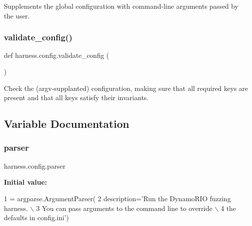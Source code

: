 \begin{DoxyVerb}Supplements the global configuration with command-line arguments
passed by the user.
\end{DoxyVerb}
 \mbox{\label{namespaceharness_1_1config_a372fafd2683cb16e932d6e9ffbf57a54}} 
\subsubsection{\texorpdfstring{validate\+\_\+config()}{validate\_config()}}
{\footnotesize\ttfamily def harness.\+config.\+validate\+\_\+config (\begin{DoxyParamCaption}{ }\end{DoxyParamCaption})}

\begin{DoxyVerb}Check the (argv-supplanted) configuration, making sure that
all required keys are present and that all keys satisfy their
invariants.
\end{DoxyVerb}
 

\subsection{Variable Documentation}
\mbox{\label{namespaceharness_1_1config_a6c9cc6f9d2a08192aa2ae0f5a0e1fc9d}} 
\subsubsection{\texorpdfstring{parser}{parser}}
{\footnotesize\ttfamily harness.\+config.\+parser}

{\bfseries Initial value\+:}
\begin{DoxyCode}
1 =  argparse.ArgumentParser(
2     description=\textcolor{stringliteral}{'Run the DynamoRIO fuzzing harness. \(\backslash\)}
3 \textcolor{stringliteral}{    You can pass arguments to the command line to override \(\backslash\)}
4 \textcolor{stringliteral}{    the defaults in config.ini'})
\end{DoxyCode}
